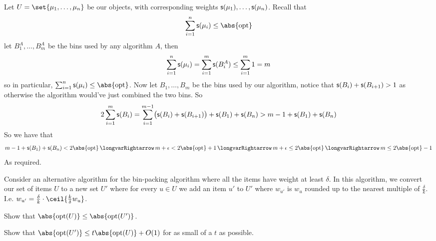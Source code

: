 \eexerc

Let $U=\set{\mu_1,\dots,\mu_n}$ be our objects, with corresponding weights ${\sf s}(\mu_1),\dots,{\sf s}(\mu_n)$.
Recall that
$$ \sum_{i=1}^n\s s(\mu_i) \leq \abs{\rm opt} $$
let $B_1^A,\dots,B_m^A$ be the bins used by any algorithm $A$, then
$$ \sum_{i=1}^n{\sf s}(\mu_i) = \sum_{i=1}^m{\sf s}(B_i^A) \leq \sum_{i=1}^m1 = m $$
so in particular, $\sum_{i=1}^n\s s(\mu_i)\leq\abs{\rm opt}$.
Now let $B_1,\dots,B_m$ be the bins used by our algorithm, notice that ${\sf s}(B_i)+{\sf s}(B_{i+1})>1$ as otherwise the algorithm would've just combined the two bins.
So
$$ 2\sum_{i=1}^m{\sf s}(B_i) = \sum_{i=1}^{m-1}\bigl({\sf s}(B_i)+{\sf s}(B_{i+1})\bigr) + {\sf s}(B_1) + {\sf s}(B_n) > m - 1 + {\sf s}(B_1) + {\sf s}(B_n) $$
So we have that
$$ m - 1 + \s s(B_1) + \s s(B_n) < 2\abs{\rm opt} \implies m + \epsilon < 2\abs{\rm opt} + 1 \implies m + \epsilon \leq 2\abs{\rm opt} \implies m \leq 2\abs{\rm opt} - 1 $$
As required.

\def\opt{{\rm opt}}
\bexerc

    Consider an alternative algorithm for the bin-packing algorithm where all the items have weight at least $\delta$.
    In this algorithm, we convert our set of items $U$ to a new set $U'$ where for every $u\in U$ we add an item $u'$ to $U'$ where $w_{u'}$ is $w_u$ rounded up to the nearest multiple of $\frac\delta k$.
    I.e. $w_{u'}=\frac\delta k\cdot\ceil{\frac k\delta w_u}$.
    \benum
        \item Show that $\abs{\opt(U)}\leq\abs{\opt(U')}$.
        \item Show that $\abs{\opt(U')}\leq t\abs{\opt(U)}+O(1)$ for as small of a $t$ as possible.
    \eenum

\eexerc

